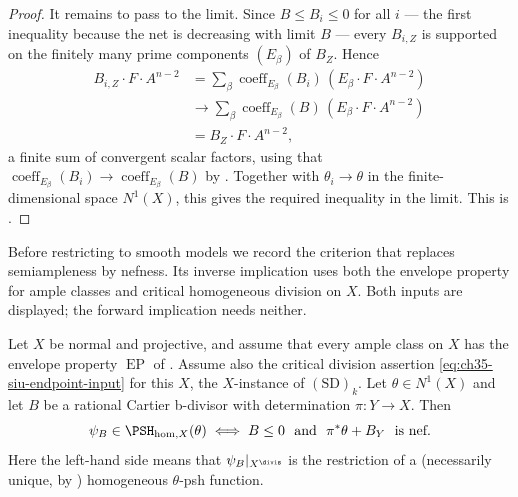 \begin{proof}
It remains to pass to the limit.  Since $B\leq B_i\leq0$ for all
$i$ --- the first inequality because the net is decreasing with limit
$B$ --- every $B_{i,Z}$ is supported on the finitely many prime
components $(E_\beta)$ of $B_Z$.  Hence
\[
 \begin{aligned}
 B_{i,Z}\cdot F\cdot A^{n-2}
 &=\sum_\beta\operatorname{coeff}_{E_\beta}(B_i)\,
   (E_\beta\cdot F\cdot A^{n-2})\\
 &\longrightarrow
 \sum_\beta\operatorname{coeff}_{E_\beta}(B)\,
   (E_\beta\cdot F\cdot A^{n-2})\\
 &=B_Z\cdot F\cdot A^{n-2},
 \end{aligned}
\]
a finite sum of convergent scalar factors, using that
$\operatorname{coeff}_{E_\beta}(B_i)\to\operatorname{coeff}_{E_\beta}(B)$
by .  Together with
$\theta_i\to\theta$ in the finite-dimensional space $N^1(X)$, this gives
the required inequality in the limit.  This is
\cite[Lemma~6.37]{BJ22}.
\end{proof}

Before restricting to smooth models we record the criterion that replaces
semiampleness by nefness. Its inverse implication uses both the envelope
property for ample classes and critical homogeneous division on $X$.
Both inputs are displayed; the forward implication needs neither.

\begin{theorem}
\label{thm:ch35-cartier-psh-criterion}
Let $X$ be normal and projective, and assume that every ample class on
$X$ has the envelope property $\operatorname{EP}$ of
. Assume also the critical division
assertion \eqref{eq:ch35-siu-endpoint-input} for this $X$, the
$X$-instance of $\mathrm{(SD)}_k$. Let $\theta\in N^1(X)$ and let $B$ be a
rational Cartier b-divisor with determination $\pi:Y\to X$.  Then
\begin{equation}
\label{eq:ch35-cartier-psh-criterion}
 \psi_B\in\PSH_{\mathrm{hom},X}(\theta)
 \iff
 B\leq0\ \text{ and }\ \pi^*\theta+B_Y\ \text{ is nef}.
\end{equation}
Here the left-hand side means that $\psi_B|_{X^{\divis}}$ is the
restriction of a (necessarily unique, by
) homogeneous $\theta$-psh
function.
\end{theorem}

